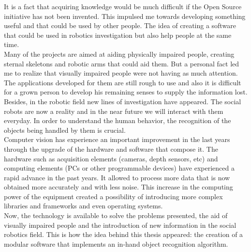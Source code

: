 It is a fact that acquiring knowledge would be much difficult if the Open Source initiative has not been invented. This impulsed me towards developing something useful and that could be used by other people. The idea of creating a software that could be used in robotics investigation but also help people at the same time. 
\\[0.5cm]

Many of the projects are aimed at aiding physically impaired people, creating sternal skeletons and robotic arms that could aid them. But a personal fact led me to realize that visually impaired people were not having as much attention. The applications developed for them are still rough to use and also it is difficult for a grown person to develop his remaining senses to supply the information lost. 
\\

Besides, in the robotic field new lines of investigation have appeared. The social robots are now a reality and in the near future we will interact with them everyday. In order to understand the human behavior, the recognition of the objects being handled by them is crucial. 
\\[0.5cm]


Computer vision has experience an important improvement in the last years through the upgrade of the hardware and software that compose it. The hardware such as acquisition elements (cameras, depth sensors, etc) and computing elements (PCs or other programmable devices) have experienced a rapid advance in the past years. It allowed to process more data that is now obtained more accurately and with less noise. This increase in the computing power of the equipment created a possibility of introducing more complex libraries and frameworks and even operating systems. 
\\

Now, the technology is available to solve the problems presented, the aid of visually impaired people and the introduction of new information in the social robotics field. This is how the idea behind this thesis appeared: the creation of a modular software that implements an in-hand object recognition algorithm. 
